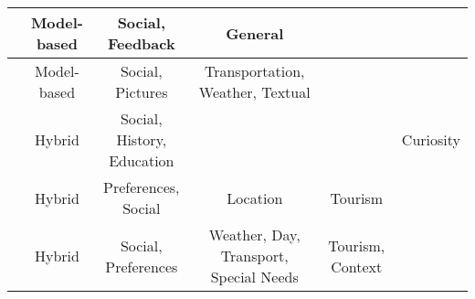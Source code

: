 \begin{table*}[h!]
\begin{tabular}{|c|c|c|c|c|c|}
        \cite{hidasi2016general} & Model-based & Social, Feedback  & General &  & \\ \hline

        \cite{sun2019building} & Model-based & Social, Pictures & Transportation, Weather, Textual &  & \\ \hline

        \cite{menk2017curumim} & Hybrid & Social, History, Education &  &  & Curiosity \\ \hline

        \cite{garcia2009speta} & Hybrid & Preferences, Social & Location & Tourism & \\ \hline

        \cite{alonso2012ontology} & Hybrid & Social, Preferences & Weather, Day, Transport, Special Needs & Tourism, Context & \\ \hline

    \end{tabular}
    
    \end{table*}



